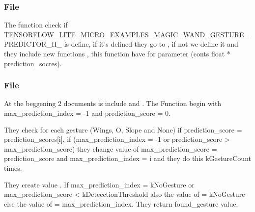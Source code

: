 \subsubsection{File }


The function  check if  TENSORFLOW\_LITE\_MICRO\_EXAMPLES\_MAGIC\_WAND\_GESTURE\_PREDICTOR\_H\_ is define, if it's defined they go to , if not we define it and they include new functions , this function have for parameter (conts float * prediction\_socres).

\begin{center}
    		
    \label{Magic Wand  gesture predictor}
\end{center}



\subsubsection{File }

At the beggening 2 documents is include  and . The Function  begin with max\_prediction\_index = -1 and prediction\_score = 0. 

\bigskip 

They check for each gesture (Wings, O, Slope and None) if prediction\_score = prediction\_scores[i], if (max\_prediction\_index = -1  or prediction\_score > max\_prediction\_score) they change value of max\_prediction\_score = prediction\_score and max\_prediction\_index = i and they do this kGestureCount times. 

\bigskip 

They create value . If max\_prediction\_index = kNoGesture or max\_prediction\_score < kDetecctionThreshold also the value of  = kNoGesture else the value of  = max\_prediction\_index. They return found\_gesture value. 

\bigskip

\begin{center}
    		
    \label{Magic Wand gesture predictor}
\end{center}



